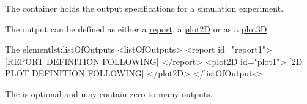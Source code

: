 \label{sec:listOfOutputs}

The  container holds the output specifications for a simulation experiment. 
%
%

The output can be defined as either a \hyperref[class:report]{report}, a \hyperref[class:2dPlot]{plot2D} or  as a \hyperref[class:plot3D]{plot3D}. 

%
\begin{myXmlLst}{The  element}{lst:listOfOutputs}
<listOfOutputs>
 <report id="report1">
  [REPORT DEFINITION FOLLOWING]
 </report>
 <plot2D id="plot1">
  [2D PLOT DEFINITION FOLLOWING] 
 </plot2D>
</listOfOutputs>
\end{myXmlLst}
The  is optional and may contain zero to many outputs. 
%

